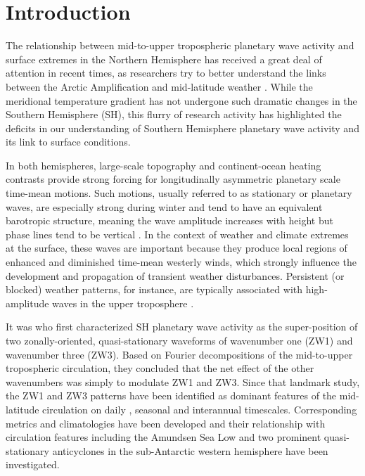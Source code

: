 \section{Introduction}\label{s:introduction}

The relationship between mid-to-upper tropospheric planetary wave activity and surface extremes in the Northern Hemisphere has received a great deal of attention in recent times, as researchers try to better understand the links between the Arctic Amplification and mid-latitude weather \citep[e.g.][]{Cohen2014,Screen2014}. While the meridional temperature gradient has not undergone such dramatic changes in the Southern Hemisphere (SH), this flurry of research activity has highlighted the deficits in our understanding of Southern Hemisphere planetary wave activity and its link to surface conditions. 

In both hemispheres, large-scale topography and continent-ocean heating contrasts provide strong forcing for longitudinally asymmetric planetary scale time-mean motions. Such motions, usually referred to as stationary or planetary waves, are especially strong during winter and tend to have an equivalent barotropic structure, meaning the wave amplitude increases with height but phase lines tend to be vertical \citep{Holton2013}. In the context of weather and climate extremes at the surface, these waves are important because they produce local regions of enhanced and diminished time-mean westerly winds, which strongly influence the development and propagation of transient weather disturbances. Persistent (or blocked) weather patterns, for instance, are typically associated with high-amplitude waves in the upper troposphere \citep[e.g.][]{Trenberth1985,Renwick2005}.

It was \citet{vanLoon1972} who first characterized SH planetary wave activity as the super-position of two zonally-oriented, quasi-stationary waveforms of wavenumber one (ZW1) and wavenumber three (ZW3). Based on Fourier decompositions of the mid-to-upper tropospheric circulation, they concluded that the net effect of the other wavenumbers was simply to modulate ZW1 and ZW3. Since that landmark study, the ZW1 and ZW3 patterns have been identified as dominant features of the mid-latitude circulation on daily \citep[e.g.][]{Kidson1988}, seasonal \citep[e.g.][]{Mo1985} and interannual \citep[e.g.][]{Karoly1989} timescales. Corresponding metrics and climatologies have been developed \citep{Raphael2004,Hobbs2007} and their relationship with circulation features including the Amundsen Sea Low \citep{Turner2013} and two prominent quasi-stationary anticyclones in the sub-Antarctic western hemisphere \citep{Hobbs2010} have been investigated.

